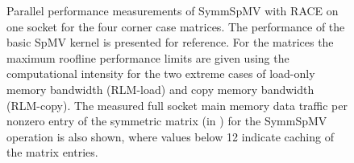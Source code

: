 \begin{figure}[t]
	\centering
	\caption{Parallel performance measurements of \acrshort{SymmSpMV}
	with \acrshort{RACE} on one \SKX socket for the four
	corner case matrices. The performance of the
	basic \acrshort{SpMV} kernel is presented for reference. For the
	matrices 
	the maximum roof{}line performance limits  are
	given using the computational intensity  for
	the two extreme cases of load-only memory bandwidth (RLM-load) and copy
	memory bandwidth (RLM-copy). The measured full socket main memory data
	traffic per nonzero entry of the symmetric matrix (in \BYTE) for the \acrshort{SymmSpMV}
	 operation is also shown, where values below 12 \BYTE indicate caching of the matrix entries.}
	\label{fig:corner_cases_scaling}
\end{figure}

